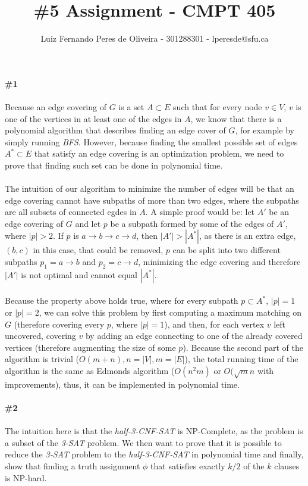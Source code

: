 \documentclass{article}
\title{\#5 Assignment - CMPT 405}
\author{Luiz Fernando Peres de Oliveira - 301288301 - lperesde@sfu.ca}
\begin{document}
\maketitle
\textbf{\#1}
\\
\\
Because an edge covering of $G$ is a set $A \subset E$ such that for every node $v \in V$, $v$ is one of the vertices in at least one of the edges in $A$, we know that there is a polynomial algorithm that describes finding an edge cover of $G$, for example by simply running \textit{BFS}. However, because finding the smallest possible set of edges $A^* \subset E$ that satisfy an edge covering is an optimization problem, we need to prove that finding such set can be done in polynomial time.
\\
\\
The intuition of our algorithm to minimize the number of edges will be that an edge covering cannot have subpaths of more than two edges, where the subpaths are all subsets of connected egdes in $A$. A simple proof would be: let $A'$ be an edge covering of $G$ and let $p$ be a subpath formed by some of the edges of $A'$, where $|p| > 2$. If $p$ is $a \rightarrow b \rightarrow c \rightarrow d$, then $|A'| > |A^*|$, as there is an extra edge, $(b, c)$ in this case, that could be removed,  $p$ can be split into two different subpaths $p_1 = a \rightarrow b$ and $p_2 = c \rightarrow d$, minimizing the edge covering and therefore $|A'|$ is not optimal and cannot equal $|A^*|$.
\\
\\
Because the property above holds true, where for every subpath $p \subset A^*$, $|p| = 1$ or $|p| = 2$, we can solve this problem by first computing a maximum matching on $G$ (therefore covering every $p$, where $|p| = 1$), and then, for each vertex $v$ left uncovered, covering $v$ by adding an edge connecting to one of the already covered vertices (therefore augmenting the size of some $p$). Because the second part of the algorithm is trivial ($O(m+n), n = |V|, m = |E|$), the total running time of the algorithm is the same as Edmonds algorithm ($O(n^2m)$ or $O(\sqrt{m}n$ with improvements), thus, it can be implemented in polynomial time.
\\
\\
\textbf{\#2}
\\
\\
The intuition here is that the \textit{half-3-CNF-SAT} is NP-Complete, as the problem is a subset of the \textit{3-SAT} problem. We then want to prove that it is possible to reduce the \textit{3-SAT} problem to the \textit{half-3-CNF-SAT} in polynomial time and finally, show that finding a truth assignment $\phi$ that satisfies exactly $k/2$ of the $k$ clauses is NP-hard.
\end{document}

